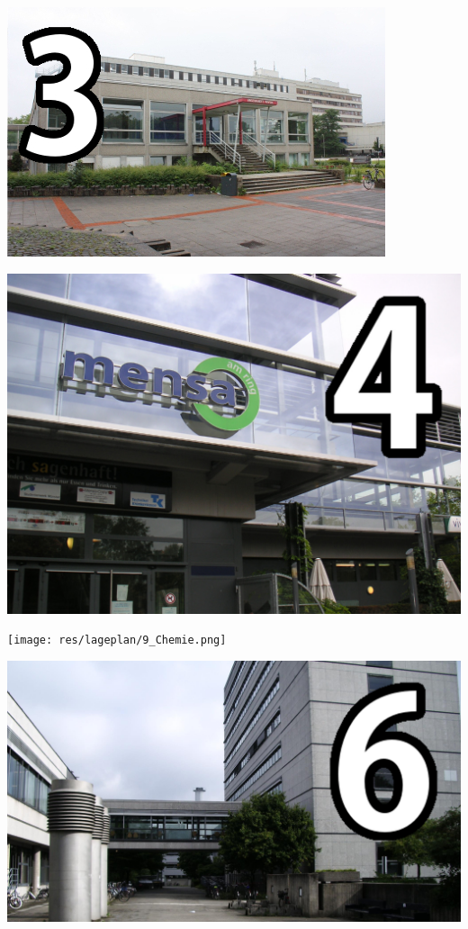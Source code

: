 {\vspace{1ex}

\begin{minipage}[c]{0.45\textwidth}
	\includegraphics[width=\columnwidth]{res/lageplan/3_AP.jpg}
\end{minipage}
\hfill
\begin{minipage}[c]{0.45\textwidth}
	\includegraphics[width=\columnwidth]{res/lageplan/4_Mensa.jpg}
\end{minipage}

\begin{minipage}[c]{0.45\textwidth}
	\texttt{[image: res/lageplan/9\_Chemie.png]}
\end{minipage}
\hfill
\begin{minipage}[c]{0.45\textwidth}
	\includegraphics[width=\columnwidth]{res/lageplan/6_Mathe.jpg}
\end{minipage}

}

